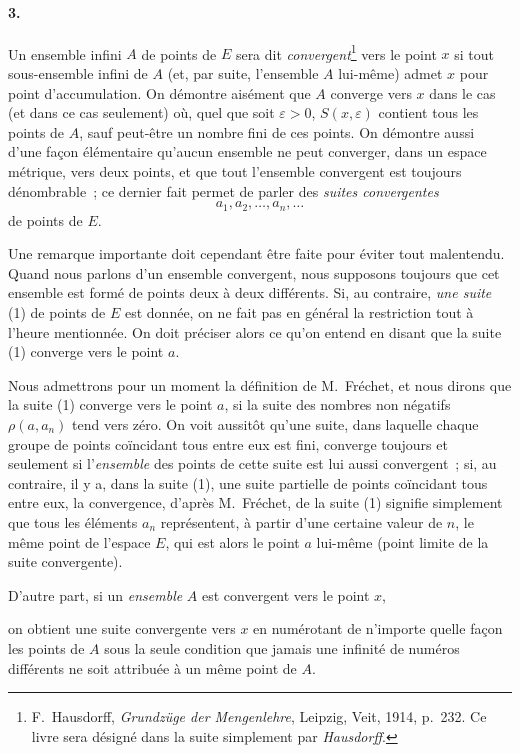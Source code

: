 \documentclass[a4paper,12pt]{amsart}
\newcommand{\srcpage}[1]{} %
\begin{document}
\paragraph{3.}
Un ensemble infini $A$ de points de $E$ sera dit \textit{convergent}\footnote{F.~Hausdorff, \textit{Grundz\"uge der Mengenlehre}, Leipzig, Veit, 1914, p.~232. Ce livre sera désigné dans la suite simplement par \textit{Hausdorff}.}
vers le point $x$ si tout sous-ensemble infini de $A$ (et, par suite, l'ensemble $A$ lui-même) admet $x$ pour point d'accumulation. On démontre aisément que $A$ converge vers $x$ dans le cas (et dans ce cas seulement) où, quel que soit $\varepsilon>0$, $S(x,\varepsilon)$ contient tous les points de $A$, sauf peut-être un nombre fini de ces points. On démontre aussi d'une façon élémentaire qu'aucun ensemble ne peut converger, dans un espace métrique, vers deux points, et que tout l'ensemble convergent est toujours dénombrable~; ce dernier fait permet de parler des \textit{suites convergentes}
\begin{equation}\tag{1}\label{u:eq1}
a_1,a_2,\dots,a_n,\dots
\end{equation}
de points de $E$.

Une remarque importante doit cependant être faite pour éviter tout malentendu. Quand nous parlons d'un ensemble convergent, nous supposons toujours que cet ensemble est formé de points deux à deux différents. Si, au contraire, \textit{une suite} (1) de points de $E$ est donnée, on ne fait pas en général la restriction tout à l'heure mentionnée. On doit préciser alors ce qu'on entend en disant que la suite (1) converge vers le point $a$.

Nous admettrons pour un moment la définition de M.~Fréchet, et nous dirons que la suite (1) converge vers le point $a$, si la suite des nombres non négatifs $\rho(a,a_n)$ tend vers zéro. On voit aussitôt qu'une suite, dans laquelle chaque groupe de points coïncidant tous entre eux est fini, converge toujours et seulement si l'\textit{ensemble} des points de cette suite est lui aussi convergent~; si, au contraire, il y a, dans la suite (1), une suite partielle de points coïncidant tous entre eux, la convergence, d'après M.~Fréchet, de la suite (1) signifie simplement que tous les éléments $a_n$ représentent, à partir d'une certaine valeur de $n$, le même point de l'espace $E$, qui est alors le point $a$ lui-même (point limite de la suite convergente).

D'autre part, si un \textit{ensemble} $A$ est convergent vers le point $x$,
\srcpage{46}
on obtient une suite convergente vers $x$ en numérotant de n'importe quelle façon les points de $A$ sous la seule condition que jamais une infinité de numéros différents ne soit attribuée à un même point de $A$.
\end{document}
